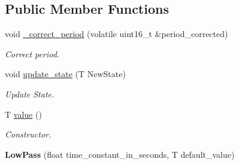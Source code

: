 \subsection*{Public Member Functions}
\begin{DoxyCompactItemize}
\item 
void \hyperlink{classSPMB_1_1LowPass_a11696a906cb869ccf580673b8ddfee3b}{\+\_\+correct\+\_\+period} (volatile uint16\+\_\+t \&period\+\_\+corrected)\hypertarget{classSPMB_1_1LowPass_a11696a906cb869ccf580673b8ddfee3b}{}\label{classSPMB_1_1LowPass_a11696a906cb869ccf580673b8ddfee3b}

\begin{DoxyCompactList}\small\item\em Correct period. \end{DoxyCompactList}\item 
void \hyperlink{classSPMB_1_1LowPass_ac01c87236e0a4974e0fe63c648ad0a7e}{update\+\_\+state} (T New\+State)\hypertarget{classSPMB_1_1LowPass_ac01c87236e0a4974e0fe63c648ad0a7e}{}\label{classSPMB_1_1LowPass_ac01c87236e0a4974e0fe63c648ad0a7e}

\begin{DoxyCompactList}\small\item\em Update State. \end{DoxyCompactList}\item 
T \hyperlink{classSPMB_1_1LowPass_a5f21ff8ce24fcbd7296edd991b425556}{value} ()\hypertarget{classSPMB_1_1LowPass_a5f21ff8ce24fcbd7296edd991b425556}{}\label{classSPMB_1_1LowPass_a5f21ff8ce24fcbd7296edd991b425556}

\begin{DoxyCompactList}\small\item\em Constructor. \end{DoxyCompactList}\item 
{\bfseries Low\+Pass} (float time\+\_\+constant\+\_\+in\+\_\+seconds, T default\+\_\+value)\hypertarget{classSPMB_1_1LowPass_a763169e42d8a7059a77a6fda0ae98f24}{}\label{classSPMB_1_1LowPass_a763169e42d8a7059a77a6fda0ae98f24}

\end{DoxyCompactItemize}
